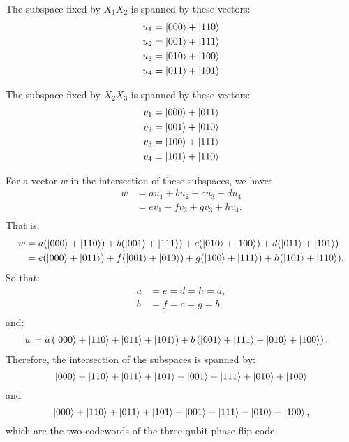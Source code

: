 \documentclass[12pt]{extarticle}
\begin{document}
The subspace fixed by $X_1X_2$ is spanned by these vectors:
\begin{align*}
u_1 & = \ket{000} + \ket{110} \\
u_2 & = \ket{001} + \ket{111} \\
u_3 & = \ket{010} + \ket{100} \\
u_4 & = \ket{011} + \ket{101} \\
\end{align*}

The subspace fixed by $X_2X_3$ is spanned by these vectors:
\begin{align*}
v_1 & = \ket{000} + \ket{011} \\
v_2 & = \ket{001} + \ket{010} \\
v_3 & = \ket{100} + \ket{111} \\
v_4 & = \ket{101} + \ket{110} \\
\end{align*}

For a vector $w$ in the intersection of these subspaces, we have:
\begin{align*}
w & = a u_1 + b u_2 + c u_3 + d u_4 \\
  & = e v_1 + f v_2 + g v_3 + h v_4. \\
\end{align*}
That is,
\begin{align*}
w & = a (\ket{000} + \ket{110}) + b (\ket{001} + \ket{111}) + c (\ket{010} + \ket{100}) + d (\ket{011} + \ket{101}) \\
  & = e (\ket{000} + \ket{011}) + f (\ket{001} + \ket{010}) + g (\ket{100} + \ket{111}) + h (\ket{101} + \ket{110}). \\
\end{align*}
So that:
\begin{align*}
a & = e = d = h = a, \\
b & = f = c = g = b, \\
\end{align*}
and:
\begin{align*}
w & = a \left( \ket{000} + \ket{110} + \ket{011} + \ket{101} \right) + b \left( \ket{001} + \ket{111} + \ket{010} + \ket{100} \right).
\end{align*}
Therefore, the intersection of the subspaces is spanned by:
\[
\ket{000} + \ket{110} + \ket{011} + \ket{101} + \ket{001} + \ket{111} + \ket{010} + \ket{100}
\]
and
\[
\ket{000} + \ket{110} + \ket{011} + \ket{101} - \ket{001} - \ket{111} - \ket{010} - \ket{100},
\]
which are the two codewords of the three qubit phase flip code.
\end{document}
